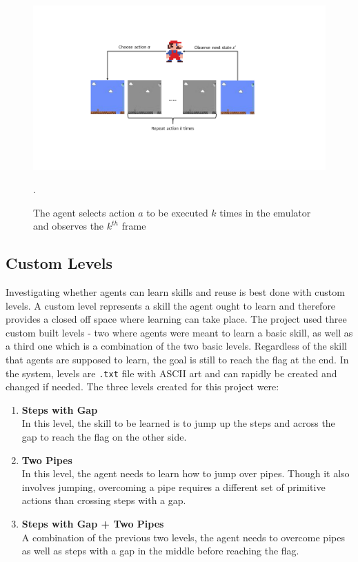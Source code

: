\documentclass[notitlepage,a4paper,11pt]{article}
\begin{document}
\begin{figure}[!htb]
\centering
\includegraphics[trim={0 4cm 0 4cm}, clip, width=1\linewidth]{figs/frame_skipping.png}
\caption{The agent selects action $a$ to be executed $k$ times in the emulator and observes the $k^{th}$ frame}.
\end{figure}

\subsection{Custom Levels}\label{custom_levels}
Investigating whether agents can learn skills and reuse is best done with custom levels. A custom level represents a skill the agent ought to learn and therefore provides a closed off space where learning can take place. The project used three custom built levels - two where agents were meant to learn a basic skill, as well as a third one which is a combination of the two basic levels. Regardless of the skill that agents are supposed to learn, the goal is still to reach the flag at the end. In the system, levels are \texttt{.txt} file with ASCII art and can rapidly be created and changed if needed. The three levels created for this project were:

\begin{enumerate}
	\item \textbf{Steps with Gap}\\
	In this level, the skill to be learned is to jump up the steps and across the gap to reach the flag on the other side.
	
	
	\item \textbf{Two Pipes}\\
	In this level, the agent needs to learn how to jump over pipes. Though it also involves jumping, overcoming a pipe requires a different set of primitive actions than crossing steps with a gap.
	
	\item \textbf{Steps with Gap + Two Pipes}\\
	A combination of the previous two levels, the agent needs to overcome pipes as well as steps with a gap in the middle before reaching the flag.
\end{enumerate}
\end{document}
